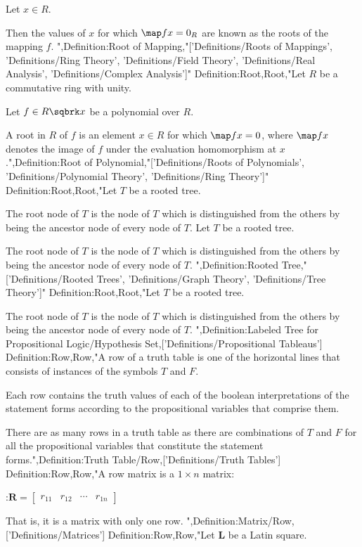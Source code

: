 Let $x \in R$.


Then the values of $x$ for which $\map f x = 0_R$ are known as the roots of the mapping $f$.
",Definition:Root of Mapping,"['Definitions/Roots of Mappings', 'Definitions/Ring Theory', 'Definitions/Field Theory', 'Definitions/Real Analysis', 'Definitions/Complex Analysis']"
Definition:Root,Root,"Let $R$ be a commutative ring with unity.

Let $f \in R \sqbrk x$ be a polynomial over $R$.


A root in $R$ of $f$ is an element $x \in R$ for which $\map f x = 0$, where $\map f x$ denotes the image of $f$ under the evaluation homomorphism at $x$.",Definition:Root of Polynomial,"['Definitions/Roots of Polynomials', 'Definitions/Polynomial Theory', 'Definitions/Ring Theory']"
Definition:Root,Root,"Let $T$ be a rooted tree.

The root node of $T$ is the node of $T$ which is distinguished from the others by being the ancestor node of every node of $T$.
Let $T$ be a rooted tree.

The root node of $T$ is the node of $T$ which is distinguished from the others by being the ancestor node of every node of $T$.
",Definition:Rooted Tree,"['Definitions/Rooted Trees', 'Definitions/Graph Theory', 'Definitions/Tree Theory']"
Definition:Root,Root,"Let $T$ be a rooted tree.

The root node of $T$ is the node of $T$ which is distinguished from the others by being the ancestor node of every node of $T$.
",Definition:Labeled Tree for Propositional Logic/Hypothesis Set,['Definitions/Propositional Tableaus']
Definition:Row,Row,"A row of a truth table is one of the horizontal lines that consists of instances of the symbols $T$ and $F$.

Each row contains the truth values of each of the boolean interpretations of the statement forms according to the propositional variables that comprise them.

There are as many rows in a truth table as there are combinations of $T$ and $F$ for all the propositional variables that constitute the statement forms.",Definition:Truth Table/Row,['Definitions/Truth Tables']
Definition:Row,Row,"A row matrix is a $1 \times n$ matrix:

:$\mathbf R = \begin{bmatrix}
r_{1 1} & r_{1 2} & \cdots & r_{1 n}
\end{bmatrix}$


That is, it is a matrix with only one row.
",Definition:Matrix/Row,['Definitions/Matrices']
Definition:Row,Row,"Let $\mathbf L$ be a Latin square.

